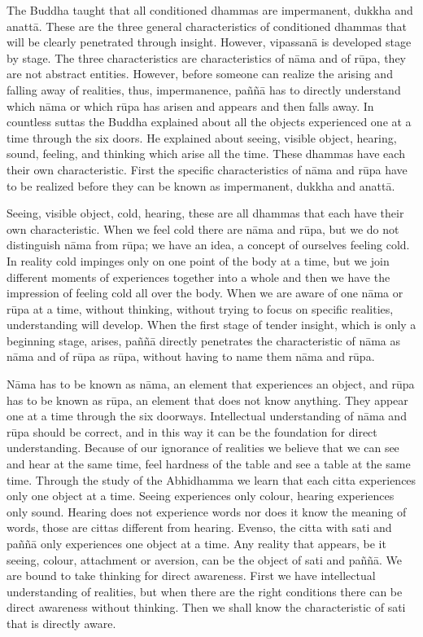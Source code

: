 The Buddha taught that all conditioned dhammas are impermanent, dukkha and anattā. These are the three general characteristics of conditioned dhammas that will be clearly penetrated through insight. However, vipassanā is developed stage by stage. The three characteristics are characteristics of nāma and of rūpa, they are not abstract entities. However, before someone can realize the arising and falling away of realities, thus, impermanence, paññā has to directly understand which nāma or which rūpa has arisen and appears and then falls away. In countless suttas the Buddha explained about all the objects experienced one at a time through the six doors. He explained about seeing, visible object, hearing, sound, feeling, and thinking which arise all the time. These dhammas have each their own characteristic. First the specific characteristics of nāma and rūpa have to be realized before they can be known as impermanent, dukkha and anattā.

Seeing, visible object, cold, hearing, these are all dhammas that each have their own characteristic. When we feel cold there are nāma and rūpa, but we do not distinguish nāma from rūpa; we have an idea, a concept of ourselves feeling cold. In reality cold impinges only on one point of the body at a time, but we join different moments of experiences together into a whole and then we have the impression of feeling cold all over the body. When we are aware of one nāma or rūpa at a time, without thinking, without trying to focus on specific realities, understanding will develop. When the first stage of tender insight, which is only a beginning stage, arises, paññā directly penetrates the characteristic of nāma as nāma and of rūpa as rūpa, without having to name them nāma and rūpa.

Nāma has to be known as nāma, an element that experiences an object, and rūpa has to be known as rūpa, an element that does not know anything. They appear one at a time through the six doorways. Intellectual understanding of nāma and rūpa should be correct, and in this way it can be the foundation for direct understanding. Because of our ignorance of realities we believe that we can see and hear at the same time, feel hardness of the table and see a table at the same time. Through the study of the Abhidhamma we learn that each citta experiences only one object at a time. Seeing experiences only colour, hearing experiences only sound. Hearing does not experience words nor does it know the meaning of words, those are cittas different from hearing. Evenso, the citta with sati and paññā only experiences one object at a time. Any reality that appears, be it seeing, colour, attachment or aversion, can be the object of sati and paññā. We are bound to take thinking for direct awareness. First we have intellectual understanding of realities, but when there are the right conditions there can be direct awareness without thinking. Then we shall know the characteristic of sati that is directly aware.

